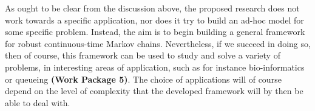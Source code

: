 \documentclass[11pt,dvipsnames,usenames,a4paper]{article}
\begin{document}
As ought to be clear from the discussion above, the proposed research does not work towards a specific application, nor does it try to build an ad-hoc model for some specific problem.
Instead, the aim is to begin building a general framework for robust continuous-time Markov chains.
Nevertheless, if we succeed in doing so, then of course, this framework can be used to study and solve a variety of problems, in interesting areas of application, such as for instance bio-informatics or queueing {\bf(Work Package 5)}. 
The choice of applications will of course depend on the level of complexity that the developed framework will by then be able to deal with.







\end{document}
